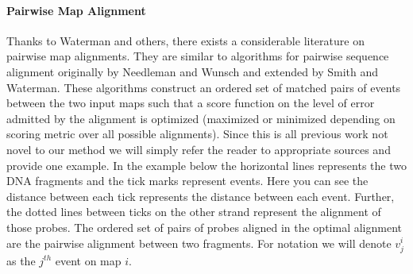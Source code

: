 \documentclass[11pt]{article}
\begin{document}


\paragraph{Pairwise Map Alignment\newline}
\par{
Thanks to Waterman and others, there exists a considerable literature on pairwise map alignments.\cite{Waterman84}\cite{Waterman1}\cite{ValouevAlignment}\cite{SOMA}  They are similar to algorithms for pairwise sequence alignment originally by Needleman and Wunsch\cite{NeedlemanWunsch} and extended by Smith and Waterman.\cite{SmithWaterman}\cite{Durbin}  These algorithms construct an ordered set of matched pairs of events between the two input maps such that a score function on the level of error admitted by the alignment is optimized (maximized or minimized depending on scoring metric over all possible alignments).  Since this is all previous work not novel to our method we will simply refer the reader to appropriate sources and provide one example.  In the example below the horizontal lines represents the two DNA fragments and the tick marks represent events.  Here you can see the distance between each tick represents the distance between each event.  Further, the dotted lines between ticks on the other strand represent the alignment of those probes.  The ordered set of pairs of probes aligned in the optimal alignment are the pairwise alignment between two fragments.  For notation we will denote $v^{i}_j$ as the $j^{th}$ event on map $i$. }
\end{document}
